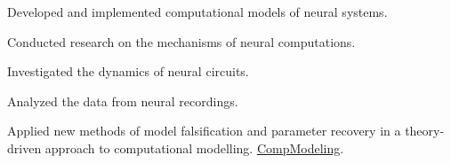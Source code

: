 \documentclass[]{plushcv}
\begin{document}
\begin{minipage}[t]{0.70\textwidth}
\sectionsep
{}
\begin{tightemize}
\item Developed and implemented computational models of neural systems.
\item Conducted research on the mechanisms of neural computations.
\item Investigated the dynamics of neural circuits.
\item Analyzed the data from neural recordings.
\item Applied new methods of model falsification and parameter recovery in a theory-driven approach to computational modelling. \href{https://github.com/Andres-AM/Computational-Modelling}{\underline{CompModeling}}.
\end{tightemize}
\sectionsep






\end{minipage}
\end{document}
